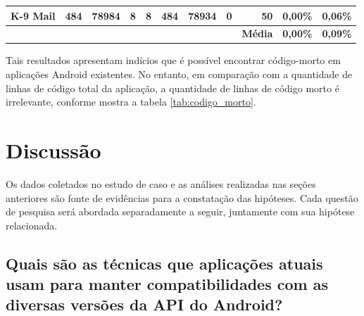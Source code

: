 \begin{table}[!htbp]
\begin{tabular}{lrrrrrrr|r|r|r|}
\multicolumn{1}{|l|}{K-9 Mail}                                                      & \multicolumn{1}{r|}{484}                                                          & \multicolumn{1}{r|}{78984}        & \multicolumn{1}{r|}{8}           & \multicolumn{1}{r|}{8}                                                            & \multicolumn{1}{r|}{484}                                                          & \multicolumn{1}{r|}{78934}        & 0                                                                                 & 50                                  & 0,00\%                                                                            & 0,06\%                               \\ \hline
                                                                                    & \multicolumn{1}{l}{}                                                              & \multicolumn{1}{l}{}              & \multicolumn{1}{l}{}             & \multicolumn{1}{l}{}                                                              & \multicolumn{1}{l}{}                                                              & \multicolumn{1}{l}{}              & \multicolumn{1}{l|}{}                                                             & \multicolumn{1}{l|}{\textbf{Média}} & \textbf{0,00\%}                                                                   & \multicolumn{1}{l|}{\textbf{0,09\%}} \\ \cline{9-11} 
\end{tabular}
\end{table}

Tais resultados apresentam indícios que é possível encontrar código-morto em aplicações
Android existentes. No entanto, em comparação com a quantidade de linhas de código total
da aplicação, a quantidade de linhas de código morto é irrelevante, conforme mostra a
tabela \ref{tab:codigo_morto}.

\section{Discussão} \label{sec:discussao}

Os dados coletados no estudo de caso e as análises realizadas nas seções anteriores
são fonte de evidências para a constatação das hipóteses. Cada questão de pesquisa
será abordada separadamente a seguir, juntamente com sua hipótese relacionada.

\subsection{Quais são as técnicas que aplicações atuais usam para manter compatibilidades
com as diversas versões da API do Android?} \label{subsec:tecnicas}

